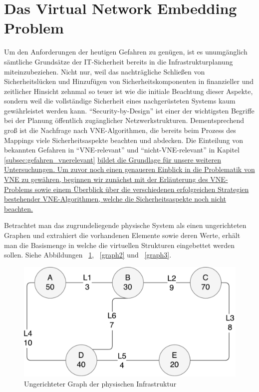 \documentclass{lni}
\begin{document}
\section{Das Virtual Network Embedding Problem}
\label{sec:VNE-Problem}
Um den Anforderungen der heutigen Gefahren zu genügen, ist es unumgänglich sämtliche Grundsätze der IT-Sicherheit bereits in die Infrastrukturplanung miteinzubeziehen. Nicht nur, weil das nachträgliche Schließen von Sicherheitslücken und Hinzufügen von Sicherheitskomponenten in finanzieller und zeitlicher Hinsicht zehnmal so teuer ist wie die initiale Beachtung dieser Aspekte, sondern weil die vollständige Sicherheit eines nachgerüsteten Systems kaum gewährleistet werden kann. \cite{Cole} "`Security-by-Design"' ist einer der wichtigsten Begriffe bei der Planung öffentlich zugänglicher Netzwerkstrukturen. Dementsprechend groß ist die Nachfrage nach VNE-Algorithmen, die bereits beim Prozess des Mappings viele Sicherheitsaspekte beachten und abdecken. Die Einteilung von bekannten Gefahren in "`VNE-relevant"' und "`nicht-VNE-relevant"' in Kapitel \ref{subsec:gefahren_vnerelevant} \underline{bildet die Grundlage für unsere weiteren Untersuchungen. Um zuvor noch einen genaueren Einblick in die Problematik von VNE zu gewähren, beginnen wir zunächst mit der Erläuterung des VNE-Problems sowie einem Überblick über die verschiedenen erfolgreichen Strategien bestehender VNE-Algorithmen, welche die Sicherheitsaspekte noch nicht beachten. }

Betrachtet man das zugrundeliegende physische System als einen ungerichteten Graphen und extrahiert die vorhandenen Elemente sowie deren Werte, erhält man die Basismenge in welche die virtuellen Strukturen eingebettet werden sollen. Siehe Abbildungen ~\ref{graph1}, ~\ref{graph2} und ~\ref{graph3}.



\begin{figure}[htb]
\begin{center}
\includegraphics[width=\textwidth]{physical_structure2.pdf}\newline
\caption{\label{graph1}Ungerichteter Graph der physischen Infrastruktur}
\end{center}
\end{figure}
\end{document}

